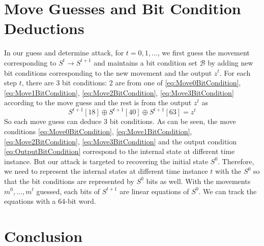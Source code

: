\section{Move Guesses and Bit Condition Deductions}
In our guess and determine attack, for $t=0,1,...$, we first guess the movement corresponding to $S^t\rightarrow S^{t+1}$ and maintains a bit condition set $\mathcal{B}$ by adding new bit conditions corresponding to the new movement and the output $z^t$. 
For each step $t$, there are 3 bit conditions: 2 are from one of \eqref{eq:Move0BitCondition}, \eqref{eq:Move1BitCondition}, \eqref{eq:Move2BitCondition}, \eqref{eq:Move3BitCondition} according to the move guess and the rest is from the output $z^t$ as
\begin{equation}\label{eq:OutputBitCondition}
S^{t+1}[18]\oplus S^{t+1}[40]\oplus S^{t+1}[63]=z^t
\end{equation}
So each move guess can deduce 3 bit conditions. 
As can be seen, the move conditions \eqref{eq:Move0BitCondition}, \eqref{eq:Move1BitCondition}, \eqref{eq:Move2BitCondition}, \eqref{eq:Move3BitCondition} and the output condition \eqref{eq:OutputBitCondition} correspond to the internal state at different time instance. 
But our attack is targeted to recovering the initial state $S^0$. 
Therefore, we need to represent the internal states at different time instance $t$ with the $S^0$ so that the bit conditions are represented by $S^0$ bits as well. 
With the movements $m^0,\ldots, m^t$ guessed, each bits of $S^{t+1}$ are linear equations of $S^0$. 
We can track the equations with a 64-bit word.  


\section{Conclusion}





\ifLNCSVER
  
\else
  
\fi





\ifLNCSVER

\else

\fi





